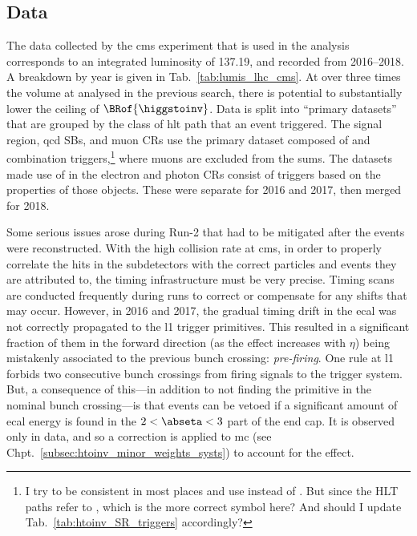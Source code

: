 

\subsection{Data}
\label{subsec:htoinv_data}

The data collected by the \acrshort{cms} experiment that is used in the analysis corresponds to an integrated luminosity of 137.19\fbinv, and recorded from 2016--2018. A breakdown by year is given in Tab.~\ref{tab:lumis_lhc_cms}. At over three times the volume at \comruntwo analysed in the previous search, there is potential to substantially lower the ceiling of $\BRof{\higgstoinv}$. Data is split into ``primary datasets'' that are grouped by the class of \acrshort{hlt} path that an event triggered. The signal region, \acrshort{qcd} \glspl{SB}, and muon \glspl{CR} use the primary dataset composed of \etmiss and \htmiss combination triggers,\footnote{I try to be consistent in most places and use \ptmiss instead of \etmiss. But since the HLT paths refer to \etmiss, which is the more correct symbol here? And should I update Tab.~\ref{tab:htoinv_SR_triggers} accordingly?} where muons are excluded from the sums. The datasets made use of in the electron and photon \glspl{CR} consist of triggers based on the properties of those objects. These were separate for 2016 and 2017, then merged for 2018.

Some serious issues arose during Run-2 that had to be mitigated after the events were reconstructed. With the high collision rate at \acrshort{cms}, in order to properly correlate the hits in the subdetectors with the correct particles and events they are attributed to, the timing infrastructure must be very precise. Timing scans are conducted frequently during runs to correct or compensate for any shifts that may occur. However, in 2016 and 2017, the gradual timing drift in the \acrshort{ecal} was not correctly propagated to the \acrlong{l1} trigger primitives. This resulted in a significant fraction of them in the forward direction (as the effect increases with $\eta$) being mistakenly associated to the previous bunch crossing: \emph{pre-firing}. One rule at \acrlong{l1} forbids two consecutive bunch crossings from firing signals to the trigger system. But, a consequence of this---in addition to not finding the primitive in the nominal bunch crossing---is that events can be vetoed if a significant amount of \acrshort{ecal} energy is found in the $\text{2} < \abseta < \text{3}$ part of the end cap. It is observed only in data, and so a correction is applied to \acrshort{mc} (see Chpt.~\ref{subsec:htoinv_minor_weights_systs}) to account for the effect.

